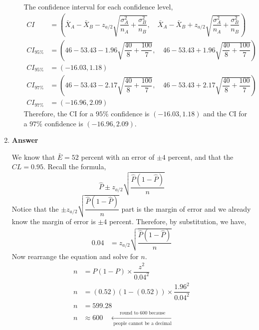 \documentclass[12pt]{book}
\begin{document}
\begin{enumerate}
\begin{enumerate}
        The confidence interval for each confidence level,
        \begin{align*}
            CI &= \left( \bar{X}_A-\bar{X}_B - z_{a/2} \sqrt{ \dfrac{\sigma^2_A}{n_A} + \dfrac{\sigma^2_B}{n_B} }, \quad \bar{X}_A-\bar{X}_B + z_{a/2} \sqrt{ \dfrac{\sigma^2_A}{n_A} + \dfrac{\sigma^2_B}{n_B} } \right)\\
            CI_{95\%} &= \left( 46-53.43 - 1.96 \sqrt{ \dfrac{40}{8} + \dfrac{100}{7} }, \quad 46-53.43 + 1.96 \sqrt{ \dfrac{40}{8} + \dfrac{100}{7} } \right)\\
            CI_{95\%} &= (-16.03, 1.18)\\
            CI_{97\%} &= \left( 46-53.43 - 2.17 \sqrt{ \dfrac{40}{8} + \dfrac{100}{7} }, \quad 46-53.43 + 2.17 \sqrt{ \dfrac{40}{8} + \dfrac{100}{7} } \right)\\
            CI_{97\%} &= (-16.96,2.09)
        \end{align*}
        Therefore, the CI for a $95\%$ confidence is $(-16.03, 1.18)$ and the CI for a $97\%$ confidence is $(-16.96,2.09)$.
        
        
    \end{enumerate}
    
    \newpage
    \item \textbf{Answer}
    
    We know that $\bar{E} = 52$ percent with an error of $\pm4$ percent, and that the $CL = 0.95$. Recall the formula,
    $$\hat{P} \pm z_{a/2}\sqrt{\dfrac{\hat{P}(1-\hat{P})}{n}}$$
    Notice that the $\pm z_{a/2}\sqrt{\dfrac{\hat{P}(1-\hat{P})}{n}}$ part is the margin of error and we already know the margin of error is $\pm4$ percent. Therefore, by substitution, we have,
    \begin{align*}
        0.04 &= z_{a/2}\sqrt{\dfrac{\hat{P}(1-\hat{P})}{n}}
    \end{align*}
    Now rearrange the equation and solve for $n$.
    \begin{align*}
        n &= P(1-P) \times \dfrac{z^2}{0.04^2}\\
        n &= (0.52)(1-(0.52)) \times \dfrac{1.96^2}{0.04^2}\\
        n &= 599.28\\
        n &\approx 600 \quad \xleftarrow[\text{ people cannot be a decimal}]{\text{ round to 600 because}}
    \end{align*}
    
    


\end{enumerate}
\end{document}
